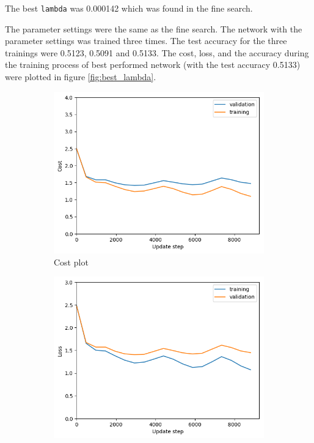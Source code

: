\documentclass[12pt]{article}
\newenvironment{question}[2][Question]{\begin{trivlist}
\kern10pt
\item[\hskip \labelsep {\bfseries #1}\hskip \labelsep {\bfseries #2.}]}{\end{trivlist}}
\begin{document}
\begin{question}{v}
The best \texttt{lambda} was 0.000142 which was found in the fine search.

The parameter settings were the same as the fine search. The network with the
parameter settings was trained three times. The test accuracy for the three trainings
were 0.5123, 0.5091 and 0.5133.
The cost, loss, and the accuracy during the training process of best performed network
(with the test accuracy 0.5133) were plotted in figure \ref{fig:best_lambda}.

\begin{figure}[!htb]
    \begin{subfigure}[b]{0.32\textwidth}
        \includegraphics[width=\linewidth]{f5_cost_plt.png}
        \caption{Cost plot}
    \end{subfigure}
    \hfill
    \begin{subfigure}[b]{0.32\textwidth}
        \includegraphics[width=\linewidth]{f5_loss_plt.png}

\end{subfigure}
\end{figure}
\end{question}
\end{document}
